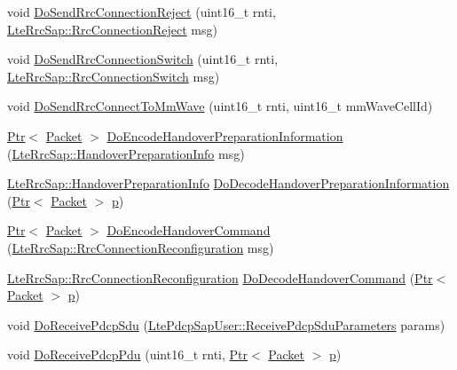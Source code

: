 \begin{DoxyCompactItemize}
\item 
void \hyperlink{classns3_1_1LteEnbRrcProtocolReal_ac8ef6cca4ac4d993d82a5f71fb75edfb}{Do\+Send\+Rrc\+Connection\+Reject} (uint16\+\_\+t rnti, \hyperlink{structns3_1_1LteRrcSap_1_1RrcConnectionReject}{Lte\+Rrc\+Sap\+::\+Rrc\+Connection\+Reject} msg)
\item 
void \hyperlink{classns3_1_1LteEnbRrcProtocolReal_af7a85d46faa67c0b07ca35b48769cca6}{Do\+Send\+Rrc\+Connection\+Switch} (uint16\+\_\+t rnti, \hyperlink{structns3_1_1LteRrcSap_1_1RrcConnectionSwitch}{Lte\+Rrc\+Sap\+::\+Rrc\+Connection\+Switch} msg)
\item 
void \hyperlink{classns3_1_1LteEnbRrcProtocolReal_afe99e811701369ea6d6c6214e2329048}{Do\+Send\+Rrc\+Connect\+To\+Mm\+Wave} (uint16\+\_\+t rnti, uint16\+\_\+t mm\+Wave\+Cell\+Id)
\item 
\hyperlink{classns3_1_1Ptr}{Ptr}$<$ \hyperlink{classns3_1_1Packet}{Packet} $>$ \hyperlink{classns3_1_1LteEnbRrcProtocolReal_ab7f715c87f35d6d5b84c75b272a532d8}{Do\+Encode\+Handover\+Preparation\+Information} (\hyperlink{structns3_1_1LteRrcSap_1_1HandoverPreparationInfo}{Lte\+Rrc\+Sap\+::\+Handover\+Preparation\+Info} msg)
\item 
\hyperlink{structns3_1_1LteRrcSap_1_1HandoverPreparationInfo}{Lte\+Rrc\+Sap\+::\+Handover\+Preparation\+Info} \hyperlink{classns3_1_1LteEnbRrcProtocolReal_adf53660699062574a1450335ede729e2}{Do\+Decode\+Handover\+Preparation\+Information} (\hyperlink{classns3_1_1Ptr}{Ptr}$<$ \hyperlink{classns3_1_1Packet}{Packet} $>$ \hyperlink{lte__link__budget__x2__handover__measures_8m_ac9de518908a968428863f829398a4e62}{p})
\item 
\hyperlink{classns3_1_1Ptr}{Ptr}$<$ \hyperlink{classns3_1_1Packet}{Packet} $>$ \hyperlink{classns3_1_1LteEnbRrcProtocolReal_a94a7341d7b0af2399ceb99a9af8ff9e6}{Do\+Encode\+Handover\+Command} (\hyperlink{structns3_1_1LteRrcSap_1_1RrcConnectionReconfiguration}{Lte\+Rrc\+Sap\+::\+Rrc\+Connection\+Reconfiguration} msg)
\item 
\hyperlink{structns3_1_1LteRrcSap_1_1RrcConnectionReconfiguration}{Lte\+Rrc\+Sap\+::\+Rrc\+Connection\+Reconfiguration} \hyperlink{classns3_1_1LteEnbRrcProtocolReal_adec80f8e9dab30402cbd715fe9580b3f}{Do\+Decode\+Handover\+Command} (\hyperlink{classns3_1_1Ptr}{Ptr}$<$ \hyperlink{classns3_1_1Packet}{Packet} $>$ \hyperlink{lte__link__budget__x2__handover__measures_8m_ac9de518908a968428863f829398a4e62}{p})
\item 
void \hyperlink{classns3_1_1LteEnbRrcProtocolReal_a6fc5f1a1a4bc595550e4adb0bb5b02ef}{Do\+Receive\+Pdcp\+Sdu} (\hyperlink{structns3_1_1LtePdcpSapUser_1_1ReceivePdcpSduParameters}{Lte\+Pdcp\+Sap\+User\+::\+Receive\+Pdcp\+Sdu\+Parameters} params)
\item 
void \hyperlink{classns3_1_1LteEnbRrcProtocolReal_a905ad5c8bd3d88a2d764da1a5d1b54f8}{Do\+Receive\+Pdcp\+Pdu} (uint16\+\_\+t rnti, \hyperlink{classns3_1_1Ptr}{Ptr}$<$ \hyperlink{classns3_1_1Packet}{Packet} $>$ \hyperlink{lte__link__budget__x2__handover__measures_8m_ac9de518908a968428863f829398a4e62}{p})
\end{DoxyCompactItemize}
